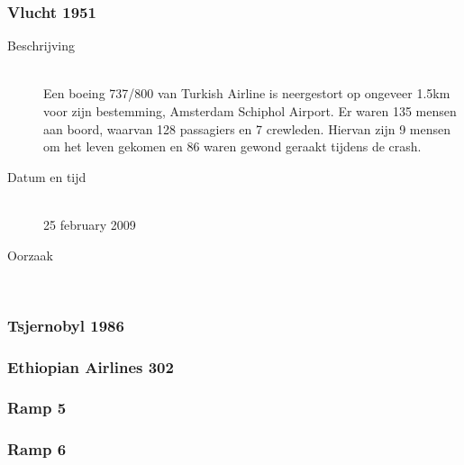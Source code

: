 \documentclass{article}%
\begin{document}
\clearpage %




\subsubsection{Vlucht 1951}
\begin{description}
\item [Beschrijving] \hfill \\
Een boeing 737/800 van Turkish Airline is neergestort op ongeveer 1.5km voor zijn bestemming, Amsterdam Schiphol Airport. Er waren 135 mensen aan boord, waarvan 128 passagiers en 7 crewleden. Hiervan zijn 9 mensen om het leven gekomen en 86 waren gewond geraakt tijdens de crash.
\item [Datum en tijd] \hfill \\
25 february 2009
\item [Oorzaak] \hfill \\
\end{description}

\subsubsection{Tsjernobyl 1986}

\subsubsection{Ethiopian Airlines 302}

\subsubsection{Ramp 5}
\subsubsection{Ramp 6}




\clearpage %
\end{document}
